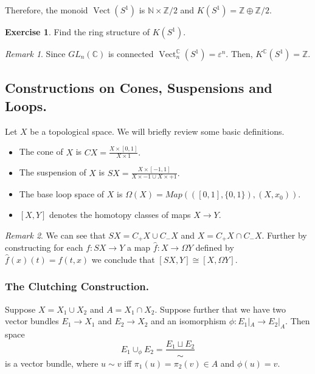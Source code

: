 \documentclass[a4paper,10pt]{article}
\theoremstyle{plain}%
\theoremstyle{definition}
\newtheorem{exer}{Exercise}
\theoremstyle{remark}
\newtheorem{rem}{Remark}
\newcommand{\NN}{\mathbb{N}}
\newcommand{\ZZ}{\mathbb{Z}}
\newcommand{\CC}{\mathbb{C}}
\DeclareMathOperator{\Vect}{Vect}
\renewcommand{\epsilon}{\varepsilon}
\begin{document}
Therefore, the monoid $\Vect(S^1)$ is $\NN\times\ZZ/2$ and $K(S^1)=\ZZ\oplus \ZZ / 2.$

\begin{exer}
Find the ring structure of $K(S^1).$
\end{exer}

\begin{rem}
Since $GL_n(\CC)$ is connected $\Vect_n^{\CC}(S^1) = {\epsilon^n}$. Then, $K^\CC (S^1) = \ZZ.$
\end{rem}

\subsection{Constructions on Cones, Suspensions and Loops.}

Let $X$ be a topological space. We will briefly review some basic definitions.

\begin{itemize}
\item The cone of $X$ is $CX=\frac{X\times[0,1]}{X\times 1}.$

\item The suspension of $X$ is $SX = \frac{X \times [-1,1]}{X\times -1\cup X\times +1}.$

\item The base loop space of $X$ is $\Omega (X) =  Map(([0,1],\{0,1\}),(X,x_0)).$

\item $[X,Y]$ denotes the homotopy classes of maps $X\to Y.$
\end{itemize}

\begin{rem}We can see that $SX = C_+X\cup C_- X$ and $X = C_+X\cap C_- X$. Further by constructing for each $f: SX\to Y$ a map $\hat{f}:X\to \Omega Y$ defined by $\hat{f}(x)(t)= f(t,x)$ we conclude that $[SX,Y]\cong [X,\Omega Y]$.
\end{rem}

\subsubsection{The Clutching Construction.}

Suppose $X = X_1 \cup X_2$ and $A= X_1 \cap X_2$. Suppose further that we have two vector bundles $E_1\to X_1$ and $E_2\to X_2$ and an isomorphism $\phi: E_1|_A \to E_2|_A.$
Then space 
\[
E_1\cup_\phi E_2 = \frac{E_1\sqcup E_2}{\sim}
\] 
is a vector bundle, where $u\sim v$ iff $\pi_1(u) = \pi_2(v)\in A$ and $\phi(u)=v$.
\end{document}
